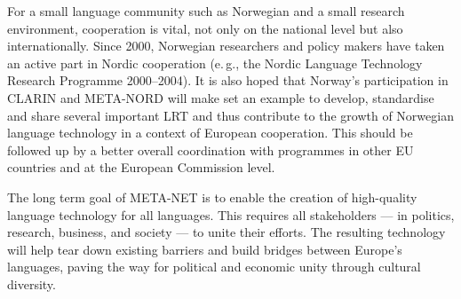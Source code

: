 \begin{multicols}{2}
For a small language community such as Norwegian and a small research
environment, cooperation is vital, not only on the national level but
also internationally. Since 2000, Norwegian researchers and policy
makers have taken an active part in Nordic cooperation (e.\,g., the Nordic Language Technology Research Programme 2000–2004). It is also hoped that Norway’s participation in CLARIN and META-NORD will make set an example to develop, standardise and share several important LRT and thus contribute to the growth of Norwegian language technology in a context of European cooperation. This should be followed up by a better overall coordination with programmes in other EU countries and at the European Commission level.



The long term goal of META-NET is to enable the creation of high-quality language technology for all languages. This requires all stakeholders --- in politics, research, business, and society --- to unite their efforts. The resulting technology will help tear down existing barriers and build bridges between Europe’s languages, paving the way for political and economic unity through cultural diversity. 

\end{multicols}

\clearpage

